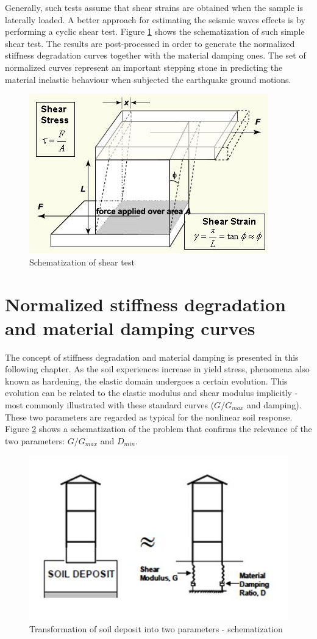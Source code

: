 \documentclass[11pt,a4paper]{report}
\begin{document}
Generally, such tests assume that shear strains are obtained when the sample is laterally loaded. A better approach for estimating the seismic waves effects is by performing a cyclic shear test. Figure \ref{fig:shear} shows the schematization of such simple shear test. The results are post-processed in order to generate the normalized stiffness degradation curves together with the material damping ones. The set of normalized curves represent an important stepping stone in predicting the material inelastic behaviour when subjected the earthquake ground motions. 

\begin{figure}[h!]
	\centering
	\includegraphics[width=0.6\linewidth]{"shear_strain_detail"}
	\caption{Schematization of shear test}
	\label{fig:shear}
\end{figure}

\section{Normalized stiffness degradation and material damping curves}
The concept of stiffness degradation and material damping is presented in this following chapter. As the soil experiences increase in yield stress, phenomena also known as hardening, the elastic domain undergoes a certain evolution. This evolution can be related to the elastic modulus and shear modulus implicitly - most commonly illustrated with these standard curves ($G/G_{max}$ and damping). These two parameters are regarded as typical for the nonlinear soil response. Figure \ref{scheme2} shows a schematization of the problem that confirms the relevance of the two parameters: $G/G_{max}$ and $D_{min}$.

\begin{figure}[h!]
	\centering
	\includegraphics[width=0.6\linewidth]{"soildeposit"}
	\caption{Transformation of soil deposit into two parameters - schematization}
	\label{scheme2}
\end{figure}
\newpage
\end{document}
